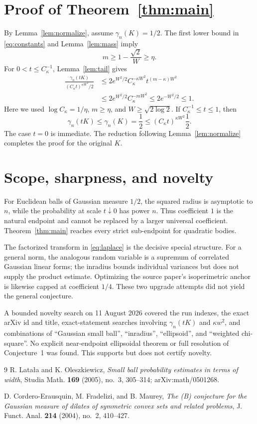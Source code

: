 \documentclass[11pt]{article}
\begin{document}
\section{Proof of Theorem~\ref{thm:main}}

By Lemma~\ref{lem:normalize}, assume $\gamma_n(K)=1/2$.  The first lower
bound in \eqref{eq:constants} and Lemma~\ref{lem:mass} imply
\[
 m\ge1-\frac{\sqrt2}{W}\ge\eta.
\]
For $0<t\le C_\kappa^{-1}$, Lemma~\ref{lem:tail} gives
\begin{align*}
 \frac{\gamma_n(tK)}{(C_\kappa t)^{\kappa W^2}/2}
 &\le2e^{W^2/2}C_\kappa^{-\kappa W^2}
 t^{(m-\kappa)W^2}\\
 &\le2e^{W^2/2}C_\kappa^{-mW^2}
 \le2e^{-W^2/2}\le1.
\end{align*}
Here we used $\log C_\kappa=1/\eta$, $m\ge\eta$, and
$W\ge\sqrt{2\log2}$.  If $C_\kappa^{-1}\le t\le1$, then
\[
 \gamma_n(tK)\le\gamma_n(K)=\frac12
 \le(C_\kappa t)^{\kappa W^2}\frac12.
\]
The case $t=0$ is immediate.  The reduction following
Lemma~\ref{lem:normalize} completes the proof for the original $K$.

\section{Scope, sharpness, and novelty}

For Euclidean balls of Gaussian measure $1/2$, the squared radius is
asymptotic to $n$, while the probability at scale $t\downarrow0$ has power
$n$.  Thus coefficient $1$ is the natural endpoint and cannot be replaced by
a larger universal coefficient.  Theorem~\ref{thm:main} reaches every strict
sub-endpoint for quadratic bodies.

The factorized transform in \eqref{eq:laplace} is the decisive special
structure.  For a general norm, the analogous random variable is a supremum
of correlated Gaussian linear forms; the inradius bounds individual
variances but does not supply the product estimate.  Optimizing the source
paper's isoperimetric anchor is likewise capped at coefficient $1/4$.  These
two upgrade attempts did not yield the general conjecture.

A bounded novelty search on 11 August 2026 covered the run indexes, the exact
arXiv id and title, exact-statement searches involving $\gamma_n(tK)$ and
$\kappa w^2$, and combinations of ``Gaussian small ball'', ``inradius'',
``ellipsoid'', and ``weighted chi-square''.  No explicit near-endpoint
ellipsoidal theorem or full resolution of Conjecture~1 was found.  This
supports but does not certify novelty.

\begin{thebibliography}{9}
R. Lata\l a and K. Oleszkiewicz,
\emph{Small ball probability estimates in terms of width},
Studia Math. \textbf{169} (2005), no.~3, 305--314;
arXiv:math/0501268.

D. Cordero-Erausquin, M. Fradelizi, and B. Maurey,
\emph{The (B) conjecture for the Gaussian measure of dilates of symmetric
convex sets and related problems},
J. Funct. Anal. \textbf{214} (2004), no.~2, 410--427.
\end{thebibliography}
\end{document}
